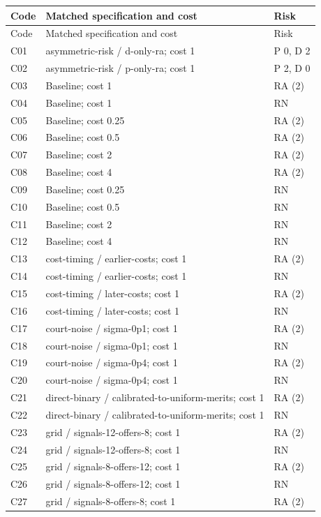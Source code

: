 \documentclass[10pt]{article}
\begin{document}
\small\begin{longtable}{@{}lp{5.4in}l@{}}\toprule Code & Matched specification and cost & Risk\\\midrule\endfirsthead
\toprule Code & Matched specification and cost & Risk\\\midrule\endhead\bottomrule\endfoot
C01 & asymmetric-risk / d-only-ra; cost 1 & P 0, D 2\\
C02 & asymmetric-risk / p-only-ra; cost 1 & P 2, D 0\\
C03 & Baseline; cost 1 & RA (2)\\
C04 & Baseline; cost 1 & RN\\
C05 & Baseline; cost 0.25 & RA (2)\\
C06 & Baseline; cost 0.5 & RA (2)\\
C07 & Baseline; cost 2 & RA (2)\\
C08 & Baseline; cost 4 & RA (2)\\
C09 & Baseline; cost 0.25 & RN\\
C10 & Baseline; cost 0.5 & RN\\
C11 & Baseline; cost 2 & RN\\
C12 & Baseline; cost 4 & RN\\
C13 & cost-timing / earlier-costs; cost 1 & RA (2)\\
C14 & cost-timing / earlier-costs; cost 1 & RN\\
C15 & cost-timing / later-costs; cost 1 & RA (2)\\
C16 & cost-timing / later-costs; cost 1 & RN\\
C17 & court-noise / sigma-0p1; cost 1 & RA (2)\\
C18 & court-noise / sigma-0p1; cost 1 & RN\\
C19 & court-noise / sigma-0p4; cost 1 & RA (2)\\
C20 & court-noise / sigma-0p4; cost 1 & RN\\
C21 & direct-binary / calibrated-to-uniform-merits; cost 1 & RA (2)\\
C22 & direct-binary / calibrated-to-uniform-merits; cost 1 & RN\\
C23 & grid / signals-12-offers-8; cost 1 & RA (2)\\
C24 & grid / signals-12-offers-8; cost 1 & RN\\
C25 & grid / signals-8-offers-12; cost 1 & RA (2)\\
C26 & grid / signals-8-offers-12; cost 1 & RN\\
C27 & grid / signals-8-offers-8; cost 1 & RA (2)\\

\end{longtable}
\end{document}
